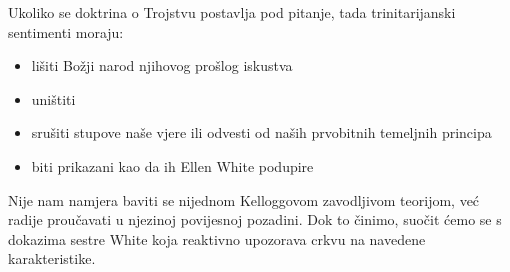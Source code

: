 Ukoliko se doktrina o Trojstvu postavlja pod pitanje, tada trinitarijanski sentimenti moraju:
\begin{itemize}
    \item lišiti Božji narod njihovog prošlog iskustva
    \item uništiti 
    \item srušiti stupove naše vjere ili odvesti od naših prvobitnih temeljnih principa
    \item biti prikazani kao da ih Ellen White podupire
\end{itemize}

Nije nam namjera baviti se nijednom Kelloggovom zavodljivom teorijom, već radije proučavati  u njezinoj povijesnoj pozadini. Dok to činimo, suočit ćemo se s dokazima sestre White koja reaktivno upozorava crkvu na navedene karakteristike.

